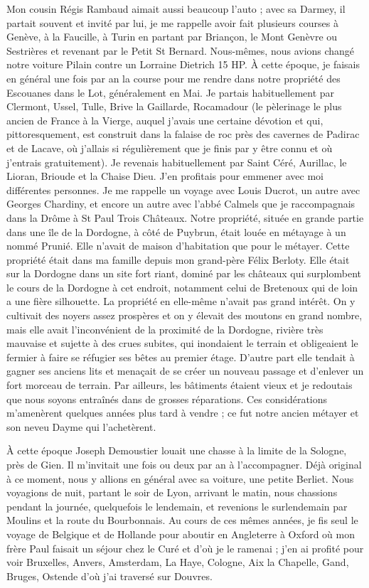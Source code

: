 \documentclass[11pt,a4paper]{report}
\begin{document}
Mon cousin Régis Rambaud aimait aussi beaucoup l'auto ; avec sa Darmey, il partait souvent et invité par lui, je me rappelle avoir fait plusieurs courses à Genève, à la Faucille, à Turin en partant par Briançon, le Mont Genèvre ou Sestrières et revenant par le Petit St Bernard. Nous-mêmes, nous avions changé notre voiture Pilain contre un Lorraine Dietrich 15 HP. À cette époque, je faisais en général une fois par an la course pour me rendre dans notre propriété des Escouanes dans le Lot, généralement en Mai. Je partais habituellement par Clermont, Ussel, Tulle, Brive la Gaillarde, Rocamadour (le pèlerinage le plus ancien de France à la Vierge, auquel j'avais une certaine dévotion et qui, pittoresquement, est construit dans la falaise de roc près des cavernes de Padirac et de Lacave, où j'allais si régulièrement que je finis par y être connu et où j'entrais gratuitement). Je revenais habituellement par Saint Céré, Aurillac, le Lioran, Brioude et la Chaise Dieu. J'en profitais pour emmener avec moi différentes personnes. Je me rappelle un voyage avec Louis Ducrot, un autre avec Georges Chardiny, et encore un autre avec l'abbé Calmels que je raccompagnais dans la Drôme à St Paul Trois Châteaux. Notre propriété, située en grande partie dans une île de la Dordogne, à côté de Puybrun, était louée en métayage à un nommé Prunié. Elle n'avait de maison d'habitation que pour le métayer. Cette propriété était dans ma famille depuis mon grand-père Félix Berloty. Elle était sur la Dordogne dans un site fort riant, dominé par les châteaux qui surplombent le cours de la Dordogne à cet endroit, notamment celui de Bretenoux qui de loin a une fière silhouette. La propriété en elle-même n'avait pas grand intérêt. On y cultivait des noyers assez prospères et on y élevait des moutons en grand nombre, mais elle avait l'inconvénient de la proximité de la Dordogne, rivière très mauvaise et sujette à des crues subites, qui inondaient le terrain et obligeaient le fermier à faire se réfugier ses bêtes au premier étage. D'autre part elle tendait à gagner ses anciens lits et menaçait de se créer un nouveau passage et d'enlever un fort morceau de terrain. Par ailleurs, les bâtiments étaient vieux et je redoutais que nous soyons entraînés dans de grosses réparations. Ces considérations m'amenèrent quelques années plus tard à vendre ; ce fut notre ancien métayer et son neveu Dayme qui l'achetèrent.

À cette époque Joseph Demoustier louait une chasse à la limite de la Sologne, près de Gien. Il m'invitait une fois ou deux par an à l'accompagner. Déjà original à ce moment, nous y allions en général avec sa voiture, une petite Berliet. Nous voyagions de nuit, partant le soir de Lyon, arrivant le matin, nous chassions pendant la journée, quelquefois le lendemain, et revenions le surlendemain par Moulins et la route du Bourbonnais. Au cours de ces mêmes années, je fis seul le voyage de Belgique et de Hollande pour aboutir en Angleterre à Oxford où mon frère Paul faisait un séjour chez le Curé et d'où je le ramenai ; j'en ai profité pour voir Bruxelles, Anvers, Amsterdam, La Haye, Cologne, Aix la Chapelle, Gand, Bruges, Ostende d'où j'ai traversé sur Douvres.
\end{document}
